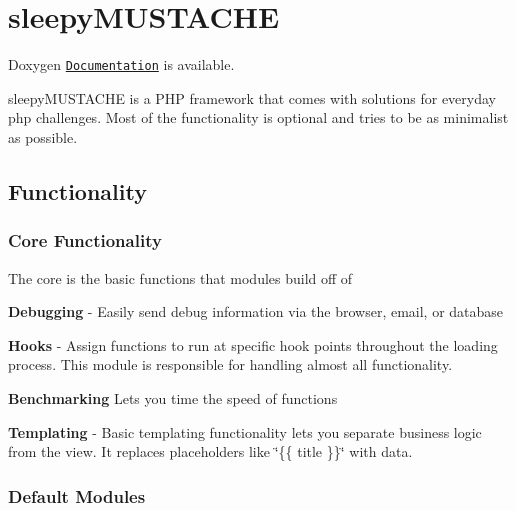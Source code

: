 \section*{sleepy\-M\-U\-S\-T\-A\-C\-H\-E}

Doxygen \href{http://www.sleepymustache.com/documentation/html/index.html}{\tt Documentation} is available.

sleepy\-M\-U\-S\-T\-A\-C\-H\-E is a P\-H\-P framework that comes with solutions for everyday php challenges. Most of the functionality is optional and tries to be as minimalist as possible.

\subsection*{Functionality}

\subsubsection*{Core Functionality}

The core is the basic functions that modules build off of


\begin{DoxyItemize}
\item {\bfseries Debugging} -\/ Easily send debug information via the browser, email, or database
\end{DoxyItemize}


\begin{DoxyItemize}
\item {\bfseries Hooks} -\/ Assign functions to run at specific hook points throughout the loading process. This module is responsible for handling almost all functionality.
\end{DoxyItemize}


\begin{DoxyItemize}
\item {\bfseries Benchmarking} Lets you time the speed of functions
\end{DoxyItemize}


\begin{DoxyItemize}
\item {\bfseries Templating} -\/ Basic templating functionality lets you separate business logic from the view. It replaces placeholders like \char`\"{}\{\{ title \}\}\char`\"{} with data.
\end{DoxyItemize}

\subsubsection*{Default Modules}

